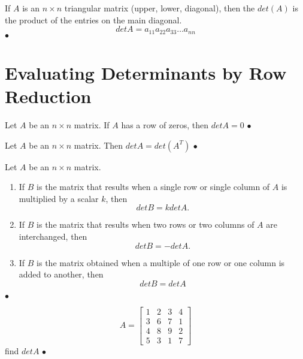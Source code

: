 \begin{theorem}
	If $A$ is an $n\times n$ triangular matrix (upper, lower, diagonal), then the $det(A)$ is the
	product of the entries on the main diagonal.
	\[detA = a_{11}a_{22}a_{33}\ldots a_{nn}\]
\smallskip\hfill$\bullet$\end{theorem}

\section{Evaluating Determinants by Row Reduction}%
\label{sec:evaluating_determinants_by_row_reduction}

\begin{theorem}[]
	Let $A$ be an $n\times n$ matrix. If $A$ has a row of zeros, then $detA = 0$
\smallskip\hfill$\bullet$\end{theorem}

\begin{theorem}[]
	Let $A$ be an $n\times n$ matrix. Then $detA = det(A^{T})$
\smallskip\hfill$\bullet$\end{theorem}

\begin{theorem}[]
	Let $A$ be an $n\times n$ matrix.
	\begin{enumerate}
		\item If $B$ is the matrix that results when a single row or single column of
			$A$ is multiplied by a scalar $k$, then
			\[ detB = k detA.\]
			\item If $B$ is the matrix that results when two rows or two columns
				of $A$ are interchanged, then
			\[ detB = - detA.\]
			\item If $B$ is the matrix obtained when a multiple of one row or
				one column is added to another, then
				\[det B = det A\]
	\end{enumerate}
\smallskip\hfill$\bullet$\end{theorem}

\begin{example}[]
	\[A = \begin{bmatrix} 1 & 2 & 3 & 4  \\ 3 & 6 & 7 & 1 \\
	4 & 8 & 9 & 2 \\ 5 & 3 & 1 & 7\end{bmatrix} \]
	find $detA$
\smallskip\hfill$\bullet$\end{example}







\newpage


